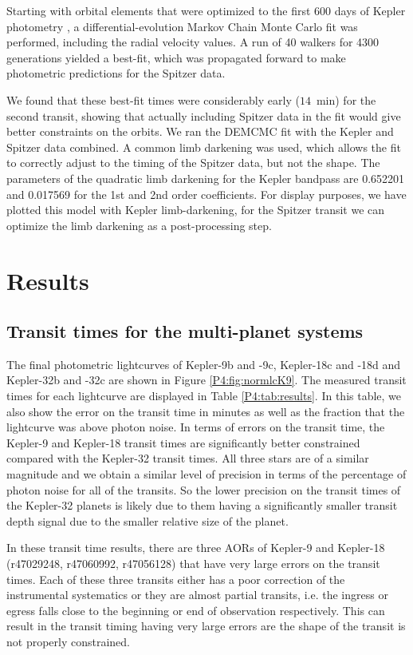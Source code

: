 Starting with orbital elements that were optimized to the first 600 days of Kepler photometry \citep{Doyle2011}, a differential-evolution Markov Chain Monte Carlo \citep[DEMCMC;][]{TerBraak2005} fit was performed, including the radial velocity values. A run of 40 walkers for 4300 generations yielded a best-fit, which was propagated forward to make photometric predictions for the Spitzer data.

We found that these best-fit times were considerably early ($14$~min) for the second transit, showing that actually including Spitzer data in the fit would give better constraints on the orbits. We ran the DEMCMC fit with the Kepler and Spitzer data combined. A common limb darkening was used, which allows the fit to correctly adjust to the timing of the Spitzer data, but not the shape. The parameters of the quadratic limb darkening for the Kepler bandpass are 0.652201 and 0.017569 for the 1st and 2nd order coefficients. For display purposes, we have plotted this model with Kepler limb-darkening, for the Spitzer transit we can optimize the limb darkening as a post-processing step.

\section{Results}
\label{P4:sec:results}

\subsection{Transit times for the multi-planet systems}

The final photometric lightcurves of Kepler-9b and -9c, Kepler-18c and -18d and Kepler-32b and -32c are shown in Figure \ref{P4:fig:normlcK9}. The measured transit times for each lightcurve are displayed in Table \ref{P4:tab:results}. In this table, we also show the error on the transit time in minutes as well as the fraction that the lightcurve was above photon noise. In terms of errors on the transit time, the Kepler-9 and Kepler-18 transit times are significantly better constrained compared with the Kepler-32 transit times. All three stars are of a similar magnitude and we obtain a similar level of precision in terms of the percentage of photon noise for all of the transits. So the lower precision on the transit times of the Kepler-32 planets is likely due to them having a significantly smaller transit depth signal due to the smaller relative size of the planet.

In these transit time results, there are three AORs of Kepler-9 and Kepler-18 (r47029248, r47060992, r47056128) that have very large errors on the transit times. Each of these three transits either has a poor correction of the instrumental systematics or they are almost partial transits, i.e. the ingress or egress falls close to the beginning or end of observation respectively. This can result in the transit timing having very large errors are the shape of the transit is not properly constrained.

